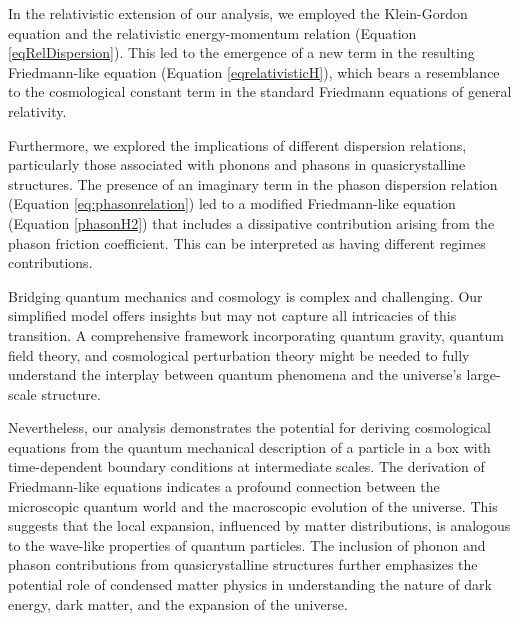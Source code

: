 \documentclass{article}
\begin{document}
In the relativistic extension of our analysis, we employed the Klein-Gordon equation and the relativistic energy-momentum relation (Equation \ref{eqRelDispersion}). This led to the emergence of a new term in the resulting Friedmann-like equation (Equation \ref{eqrelativisticH}), which bears a resemblance to the cosmological constant term in the standard Friedmann equations of general relativity.

Furthermore, we explored the implications of different dispersion relations, particularly those associated with phonons and phasons in quasicrystalline structures. The presence of an imaginary term in the phason dispersion relation (Equation \ref{eq:phasonrelation}) led to a modified Friedmann-like equation (Equation \ref{phasonH2}) that includes a dissipative contribution arising from the phason friction coefficient. This can be interpreted as having different regimes contributions. 


Bridging quantum mechanics and cosmology is complex and challenging. Our simplified model offers insights but may not capture all intricacies of this transition. A comprehensive framework incorporating quantum gravity, quantum field theory, and cosmological perturbation theory might be needed to fully understand the interplay between quantum phenomena and the universe's large-scale structure.

Nevertheless, our analysis demonstrates the potential for deriving cosmological equations from the quantum mechanical description of a particle in a box with time-dependent boundary conditions at intermediate scales. The derivation of Friedmann-like equations indicates a profound connection between the microscopic quantum world and the macroscopic evolution of the universe. This suggests that the local expansion, influenced by matter distributions, is analogous to the wave-like properties of quantum particles. The inclusion of phonon and phason contributions from quasicrystalline structures further emphasizes the potential role of condensed matter physics in understanding the nature of dark energy, dark matter, and the expansion of the universe.
\end{document}
